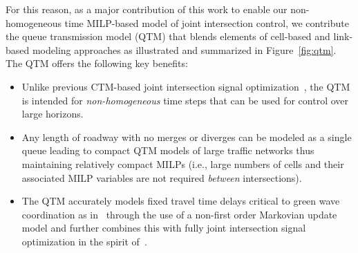For this reason, as a major contribution of this work to enable our
non-homogeneous time MILP-based model of joint intersection control, we
contribute the queue transmission model (QTM) that blends elements of
cell-based and link-based modeling approaches as illustrated
and summarized in Figure~\ref{fig:qtm}.  The QTM offers the following key benefits:
\begin{itemize}
%
\item  Unlike previous CTM-based joint intersection signal 
  optimization~, the QTM is
  intended for \emph{non-homogeneous} time steps that can
  be used for control over large horizons.
%
\item Any length of roadway with no merges or diverges can be modeled
  as a single queue leading to compact QTM models of large traffic
  networks thus maintaining relatively compact MILPs
  (i.e., large numbers of cells and their associated MILP variables are
  not required \emph{between} intersections).
%
\item The QTM accurately models fixed travel time delays critical to green wave
  coordination as
  in~
  through the use of a non-first order Markovian update model and further combines this
  with fully joint intersection signal optimization in the spirit 
  of~.
\end{itemize}

